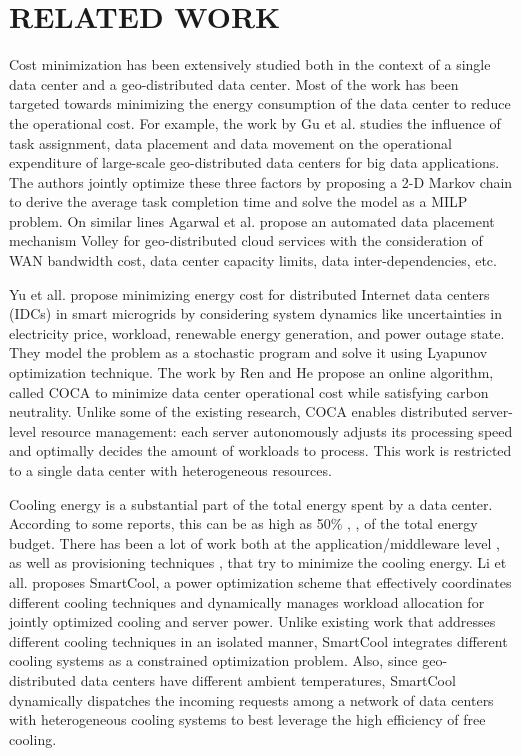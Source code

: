 \documentclass[letterpaper,twocolumn,12pt]{article}
\begin{document}
\section{RELATED WORK}
\label{sec:related} 
Cost minimization has been extensively studied both in the context of a single data center and a geo-distributed data center. Most of the work has been targeted towards minimizing the energy consumption of the data center to reduce the operational cost. For example, the work by Gu et al. \cite{gu2014cost} studies the influence of task assignment, data placement  and data movement on the operational expenditure of large-scale geo-distributed data centers for big data applications. The authors jointly optimize  these three factors by proposing a 2-D Markov chain to derive the average task completion time and solve the model as a MILP problem. On similar lines Agarwal et al. \cite{agarwal2010volley} propose an automated data placement mechanism Volley for geo-distributed cloud services with the consideration of WAN bandwidth cost, data center capacity limits, data inter-dependencies, etc. 

Yu et all.\cite{yu2015energy} propose minimizing energy cost for distributed Internet data centers (IDCs) in smart microgrids by considering system dynamics like uncertainties in electricity price, workload, renewable energy generation, and power outage state. They model the problem as a stochastic program and solve it using Lyapunov optimization technique. The work by Ren and He  \cite{ren2013coca} propose an online algorithm, called COCA to minimize data center operational cost while satisfying carbon neutrality. Unlike some of the existing research, COCA enables distributed server-level resource management: each server autonomously adjusts its processing speed and optimally decides the amount of workloads to process. This work is restricted to a single data center with heterogeneous resources. 

Cooling energy is a substantial part of the total energy spent by a data center. According to some reports, this can be as high as 50\% \cite{sullivan2002alternating}, \cite{patel2003smart},\cite{sawyer2004calculating} of the total energy budget. There has been a lot of work both at the application/middleware level \cite{TempLDBSC11}, \cite{leverich2010energy} as well as provisioning techniques  \cite{tang2007thermal}, \cite{chen2010integrated} that try to minimize the cooling energy. Li et all. \cite{li2014coordinating} proposes SmartCool, a power optimization scheme that effectively coordinates different cooling techniques and dynamically manages workload allocation for jointly optimized cooling and server power. Unlike existing work that addresses different cooling techniques in an isolated manner, SmartCool integrates different cooling systems as a constrained optimization problem. Also, since geo-distributed data centers have different ambient temperatures, SmartCool dynamically dispatches the incoming requests among a network of data centers with heterogeneous cooling systems to best leverage the high efficiency of free cooling.  
\end{document}
